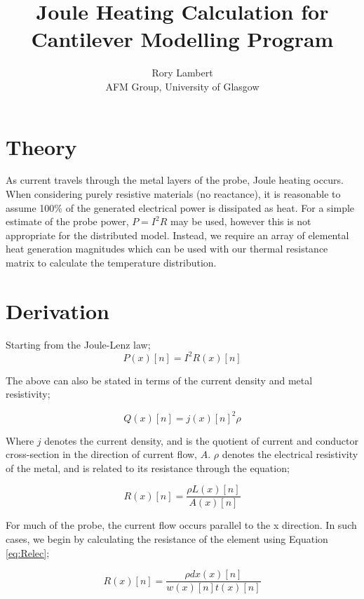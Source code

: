 \documentclass[]{report}
\title{Joule Heating Calculation for Cantilever Modelling Program}
\author{Rory Lambert\\ AFM Group, University of Glasgow}
\begin{document}
\maketitle

\section{Theory}

As current travels through the metal layers of the probe, Joule heating occurs. When considering purely resistive materials (no reactance), it is reasonable to assume 100\%  of the generated electrical power is dissipated as heat. For a simple estimate of the probe power, $P=I^2R$ may be used, however this is not appropriate for the distributed model. Instead, we require an array of elemental heat generation magnitudes which can be used with our thermal resistance matrix to calculate the temperature distribution.

\section{Derivation}

Starting from the Joule-Lenz law;
\begin{equation}\label{eq:joule}
P(x)[n]=I^2R(x)[n]
\end{equation}

The above can also be stated in terms of the current density and metal resistivity;

\begin{equation}
Q(x)[n]=j(x)[n]^2\rho
\end{equation}

Where $j$ denotes the current density, and is the quotient of current and conductor cross-section in the direction of current flow, $A$. $\rho$ denotes the electrical resistivity of the metal, and is related to its resistance through the equation;

\begin{equation}\label{eq:Relec}
R(x)[n]=\frac{\rho L(x)[n]}{A(x)[n]}
\end{equation}

For much of the probe, the current flow occurs parallel to the x direction. In such cases, we begin by calculating the resistance of the element using Equation \ref{eq:Relec};

\begin{equation}\label{eq:Relec_dist}
R(x)[n]=\frac{\rho dx(x)[n]}{w(x)[n]t(x)[n]}
\end{equation}
\end{document}
